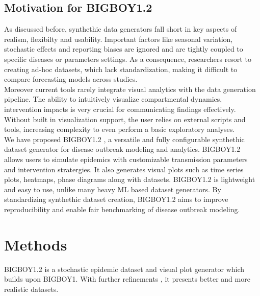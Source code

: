 \documentclass[11pt,a4paper]{article}
\theoremstyle{remark}\newtheorem{remark}{Remark}
\begin{document}
\subsection{Motivation for BIGBOY1.2}
As discussed before, synthethic data generators fall short in key aspects of realism, flexibilty and usability. Important factors like seasonal variation, stochastic effects and reporting biases are ignored and are tightly coupled to specific diseases or parameters settings. As a consequence, researchers resort to creating ad-hoc datasets, which lack standardization, making it difficult to compare forecasting models across studies. \\
Moreover current tools rarely integrate visual analytics with the data generation pipeline. The ability to intuitively visualize compartmental dynamics, intervention impacts is very crucial for communicating findings effectively. Without built in visualization support, the user relies on external scripts and tools, increasing complexity to even perform a basic exploratory analyses. \\
We have proposed BIGBOY1.2 , a versatile and fully configurable synthethic dataset generator for disease outbreak modeling and analytics. BIGBOY1.2 allows users to simulate epidemics with customizable transmission parameters and intervention stratergies. It also generates visual plots such as time series plots, heatmaps, phase diagrams along with datasets. BIGBOY1.2 is lightweight and easy to use, unlike many heavy ML based dataset generators. By standardizing synthethic dataset creation, BIGBOY1.2 aims to improve reproducibility and enable fair benchmarking of disease outbreak modeling.
\section{Methods}
BIGBOY1.2 is a stochastic epidemic dataset and visual plot generator which builds upon BIGBOY1. With further refinements , it presents better and more realistic datasets.
\end{document}
